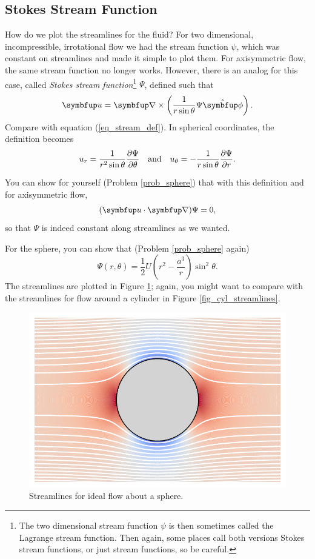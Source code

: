 \subsection{Stokes Stream Function}

How do we plot the streamlines for the fluid?  For two dimensional, incompressible, irrotational flow we had the stream function $\psi$, which was constant on streamlines and made it simple to plot them.  For axisymmetric flow, the same stream function no longer works.  However, there is an analog for this case, called \emph{Stokes stream function}\footnote{The two dimensional stream function $\psi$ is then sometimes called the Lagrange stream function.  Then again, some places call both versions Stokes stream functions, or just stream functions, so be careful.} $\Psi$, defined such that
\begin{equation}
\vec{u} = \grad \times \left( \frac{1}{r\sin \theta} \Psi \unit{\phi} \right).
\end{equation}
Compare with equation (\ref{eq_stream_def}).  In spherical coordinates, the definition becomes
\begin{equation}
\label{eq_stokes_stream}
u_r = \frac{1}{r^2 \sin \theta} \frac{\partial {\Psi}}{\partial {\theta}} \quad \text{and} \quad u_\theta = -\frac{1}{r \sin \theta} \frac{\partial {\Psi}}{\partial {r}}.
\end{equation}

You can show for yourself (Problem \ref{prob_sphere}) that with this definition and for axisymmetric flow, 
\[
(\vec{u} \cdot \grad) \Psi = 0,
\]
so that $\Psi$ is indeed constant along streamlines as we wanted.  

For the sphere, you can show that (Problem \ref{prob_sphere} again)
\begin{equation}
\Psi (r, \theta) = \frac{1}{2} U \left( r^2 - \frac{a^3}{r} \right) \sin^2 \theta.
\end{equation}
The streamlines are plotted in Figure \ref{fig_sphere_lines}; again, you might want to compare with the streamlines for flow around a cylinder in Figure \ref{fig_cyl_streamlines}.

\begin{figure}
\centering
\includegraphics[width=0.8\linewidth]{Figures/Chapter6/fig_sphere_lines}
\caption{Streamlines for ideal flow about a sphere.}
\label{fig_sphere_lines}
\end{figure}

